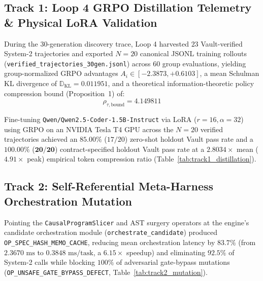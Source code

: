 \documentclass[10pt,twocolumn,letterpaper]{article}
\begin{document}
\subsection{Track 1: Loop 4 GRPO Distillation Telemetry \& Physical LoRA Validation}
During the 30-generation discovery trace, Loop 4 harvested $23$ Vault-verified System-2 trajectories and exported $N=20$ canonical JSONL training rollouts (\texttt{verified\_\allowbreak trajectories\_\allowbreak 30gen.jsonl}) across 60 group evaluations, yielding group-normalized GRPO advantages $A_{i}\in[-2.3873, +0.6103]$, a mean Schulman KL divergence of $\mathbb{D}_{\text{KL}}=0.011951$, and a theoretical information-theoretic policy compression bound (Proposition~1) of:
\begin{equation}
\rho_{\tau,\text{bound}} = 4.149811
\end{equation}

Fine-tuning \texttt{Qwen/\allowbreak Qwen2.5-Coder-1.5B-Instruct} via LoRA ($r=16, \alpha=32$) using GRPO on an NVIDIA Tesla T4 GPU across the $N=20$ verified trajectories achieved an $85.00\%$ ($17/20$) zero-shot holdout Vault pass rate and a $\mathbf{100.00\%}$ ($\mathbf{20/20}$) contract-specified holdout Vault pass rate at a $\mathbf{2.8034\times}$ mean ($4.91\times$ peak) empirical token compression ratio (Table~\ref{tab:track1_distillation}).

\begin{table}[htbp]
\centering
{}
\caption{Track 1 physical GRPO LoRA distillation results on \texttt{Qwen2.5-Coder-1.5B-Instruct} across the $N=20$ verified trajectories.}
\label{tab:track1_distillation}
\end{table}

\subsection{Track 2: Self-Referential Meta-Harness Orchestration Mutation}
Pointing the \texttt{CausalProgramSlicer} and AST surgery operators at the engine's candidate orchestration module (\texttt{orchestrate\_\allowbreak candidate}) produced \texttt{OP\_SPEC\_\allowbreak HASH\_MEMO\_\allowbreak CACHE}, reducing mean orchestration latency by $83.7\%$ (from $2.3670\text{ ms}$ to $0.3848\text{ ms/task}$, a $\mathbf{6.15\times}$ speedup) and eliminating $\mathbf{92.5\%}$ of System-2 calls while blocking $100\%$ of adversarial gate-bypass mutations (\texttt{OP\_UNSAFE\_\allowbreak GATE\_BYPASS\_\allowbreak DEFECT}, Table~\ref{tab:track2_mutation}).
\end{document}
